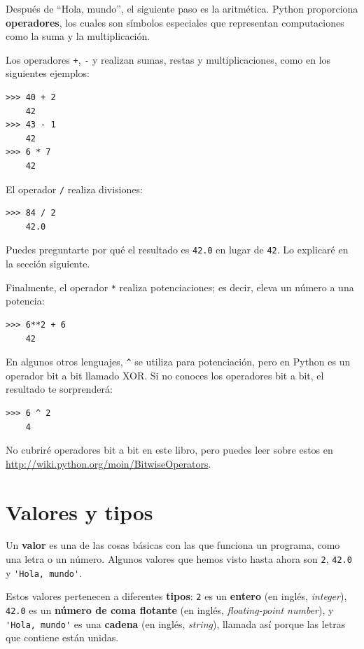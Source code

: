 \documentclass[10pt]{book}
\begin{document}
Después de ``Hola, mundo'', el siguiente paso es la aritmética.  Python
proporciona {\bf operadores}, los cuales son símbolos especiales que
representan computaciones como la suma y la multiplicación.

Los operadores {\tt +}, {\tt -} y {\tt *} realizan sumas,
restas y multiplicaciones, como en los siguientes ejemplos:

\begin{verbatim}
>>> 40 + 2
    42
>>> 43 - 1
    42
>>> 6 * 7
    42
\end{verbatim}
%
El operador {\tt /} realiza divisiones:

\begin{verbatim}
>>> 84 / 2
    42.0
\end{verbatim}
%
Puedes preguntarte por qué el resultado es {\tt 42.0} en lugar de {\tt 42}.
Lo explicaré en la sección siguiente.

Finalmente, el operador {\tt **} realiza potenciaciones; es decir,
eleva un número a una potencia:

\begin{verbatim}
>>> 6**2 + 6
    42
\end{verbatim}
%
En algunos otros lenguajes, \verb"^" se utiliza para potenciación, pero
en Python es un operador bit a bit llamado XOR.  Si no conoces
los operadores bit a bit, el resultado te sorprenderá:

\begin{verbatim}
>>> 6 ^ 2
    4
\end{verbatim}
%
No cubriré
operadores bit a bit en este libro, pero puedes leer sobre
estos en \url{http://wiki.python.org/moin/BitwiseOperators}.


\section{Valores y tipos}

Un {\bf valor} es una de las cosas básicas con las que funciona un programa,
como una letra o un número.  Algunos valores que hemos visto hasta ahora son
{\tt 2}, {\tt 42.0} y \verb"'Hola, mundo'".

Estos valores pertenecen a diferentes {\bf tipos}: {\tt 2} es un {\bf entero}
(en inglés, {\em integer}), {\tt 42.0} es un {\bf número de coma flotante} (en
inglés, {\em floating-point number}), y \verb"'Hola, mundo'" es una {\bf
cadena} (en inglés, {\em string}), llamada así porque las letras que contiene están unidas.
\end{document}
